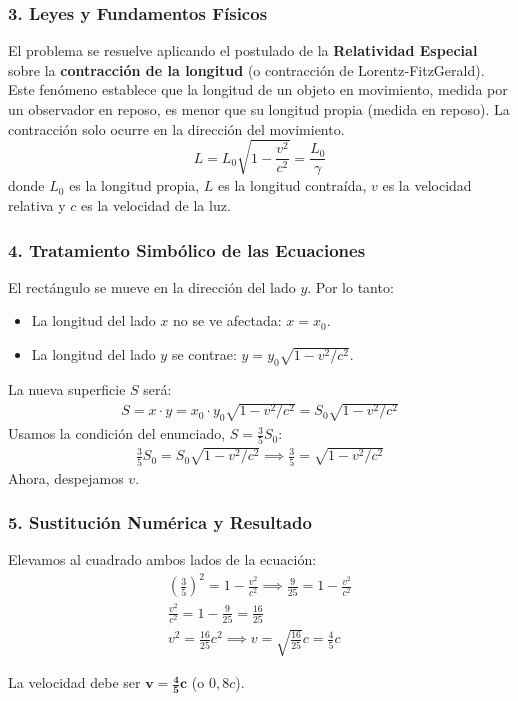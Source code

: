 \subsubsection*{3. Leyes y Fundamentos Físicos}
El problema se resuelve aplicando el postulado de la \textbf{Relatividad Especial} sobre la \textbf{contracción de la longitud} (o contracción de Lorentz-FitzGerald). Este fenómeno establece que la longitud de un objeto en movimiento, medida por un observador en reposo, es menor que su longitud propia (medida en reposo). La contracción solo ocurre en la dirección del movimiento.
$$ L = L_0 \sqrt{1 - \frac{v^2}{c^2}} = \frac{L_0}{\gamma} $$
donde $L_0$ es la longitud propia, $L$ es la longitud contraída, $v$ es la velocidad relativa y $c$ es la velocidad de la luz.

\subsubsection*{4. Tratamiento Simbólico de las Ecuaciones}
El rectángulo se mueve en la dirección del lado $y$. Por lo tanto:
\begin{itemize}
    \item La longitud del lado $x$ no se ve afectada: $x = x_0$.
    \item La longitud del lado $y$ se contrae: $y = y_0 \sqrt{1 - v^2/c^2}$.
\end{itemize}
La nueva superficie $S$ será:
\begin{gather}
    S = x \cdot y = x_0 \cdot y_0 \sqrt{1 - v^2/c^2} = S_0 \sqrt{1 - v^2/c^2}
\end{gather}
Usamos la condición del enunciado, $S = \frac{3}{5} S_0$:
\begin{gather}
    \frac{3}{5} S_0 = S_0 \sqrt{1 - v^2/c^2} \implies \frac{3}{5} = \sqrt{1 - v^2/c^2}
\end{gather}
Ahora, despejamos $v$.

\subsubsection*{5. Sustitución Numérica y Resultado}
Elevamos al cuadrado ambos lados de la ecuación:
\begin{gather}
    \left(\frac{3}{5}\right)^2 = 1 - \frac{v^2}{c^2} \implies \frac{9}{25} = 1 - \frac{v^2}{c^2} \nonumber \\[8pt]
    \frac{v^2}{c^2} = 1 - \frac{9}{25} = \frac{16}{25} \nonumber \\[8pt]
    v^2 = \frac{16}{25} c^2 \implies v = \sqrt{\frac{16}{25}} c = \frac{4}{5} c
\end{gather}
\begin{cajaresultado}
    La velocidad debe ser $\boldsymbol{v = \frac{4}{5} c}$ (o $0,8c$).
\end{cajaresultado}

